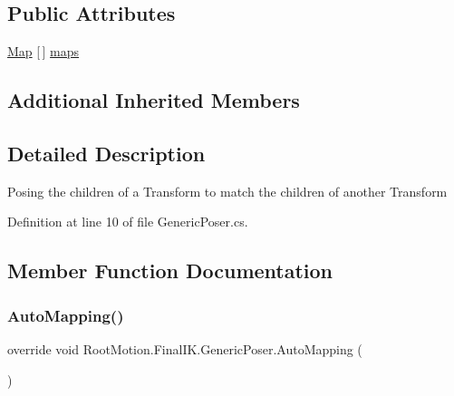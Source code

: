 \subsection*{Public Attributes}
\begin{DoxyCompactItemize}
\item 
\mbox{\hyperlink{class_root_motion_1_1_final_i_k_1_1_generic_poser_1_1_map}{Map}} \mbox{[}$\,$\mbox{]} \mbox{\hyperlink{class_root_motion_1_1_final_i_k_1_1_generic_poser_ae79ccd649b6ef7c80581384e9d725dee}{maps}}
\end{DoxyCompactItemize}
\subsection*{Additional Inherited Members}


\subsection{Detailed Description}
Posing the children of a Transform to match the children of another Transform 



Definition at line 10 of file Generic\+Poser.\+cs.



\subsection{Member Function Documentation}
\mbox{\label{class_root_motion_1_1_final_i_k_1_1_generic_poser_a38993eecf09618c2ade7f3afe8a36ad7}} 
\subsubsection{\texorpdfstring{Auto\+Mapping()}{AutoMapping()}}
{\footnotesize\ttfamily override void Root\+Motion.\+Final\+I\+K.\+Generic\+Poser.\+Auto\+Mapping (\begin{DoxyParamCaption}{ }\end{DoxyParamCaption})\hspace{0.3cm}{\ttfamily [virtual]}}



